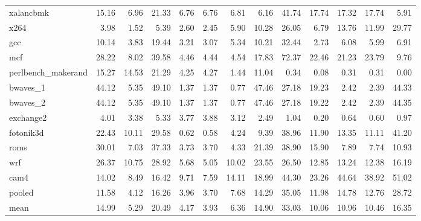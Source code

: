 \documentclass[10pt,a4paper]{article}
\begin{document}
{\begin{longtable}{@{}lrrrrrrrrrrrr@{}}
xalancbmk & 15.16 & 6.96 & 21.33 & 6.76 & 6.76 & 6.81 & 6.16 & 41.74 & 17.74 & 17.32 & 17.74 & 5.91 \\
x264 & 3.98 & 1.52 & 5.39 & 2.60 & 2.45 & 5.90 & 10.28 & 26.05 & 6.79 & 13.76 & 11.99 & 29.77 \\
gcc & 10.14 & 3.83 & 19.44 & 3.21 & 3.07 & 5.34 & 10.21 & 32.44 & 2.73 & 6.08 & 5.99 & 6.91 \\
mcf & 28.22 & 8.02 & 39.58 & 4.46 & 4.44 & 4.54 & 17.83 & 72.37 & 22.46 & 21.23 & 23.79 & 9.76 \\
perlbench\_makerand & 15.27 & 14.53 & 21.29 & 4.25 & 4.27 & 1.44 & 11.04 & 0.34 & 0.08 & 0.31 & 0.31 & 0.00 \\
bwaves\_1 & 44.12 & 5.35 & 49.10 & 1.37 & 1.37 & 0.77 & 47.46 & 27.18 & 19.23 & 2.42 & 2.39 & 44.33 \\
bwaves\_2 & 44.12 & 5.35 & 49.10 & 1.37 & 1.37 & 0.77 & 47.46 & 27.18 & 19.22 & 2.42 & 2.39 & 44.35 \\
exchange2 & 4.01 & 3.38 & 5.33 & 3.77 & 3.88 & 3.12 & 2.49 & 1.04 & 0.20 & 0.64 & 0.60 & 0.97 \\
fotonik3d & 22.43 & 10.11 & 29.58 & 0.62 & 0.58 & 4.24 & 9.39 & 38.96 & 11.90 & 13.35 & 11.11 & 41.20 \\
roms & 30.01 & 7.03 & 37.33 & 3.73 & 3.70 & 4.33 & 21.39 & 38.90 & 15.90 & 7.89 & 7.74 & 10.93 \\
wrf & 26.37 & 10.75 & 28.92 & 5.68 & 5.05 & 10.02 & 23.55 & 26.50 & 12.85 & 13.24 & 12.38 & 16.19 \\
cam4 & 14.02 & 8.49 & 16.42 & 9.71 & 7.59 & 14.11 & 18.99 & 44.30 & 23.26 & 44.64 & 38.92 & 51.02 \\
\midrule
pooled & 11.58 & 4.12 & 16.26 & 3.96 & 3.70 & 7.68 & 14.29 & 35.05 & 11.98 & 14.78 & 12.76 & 28.72 \\
mean & 14.99 & 5.29 & 20.49 & 4.17 & 3.93 & 6.36 & 14.90 & 33.03 & 10.06 & 10.96 & 10.46 & 16.35 \\
\end{longtable}
}
\end{document}
